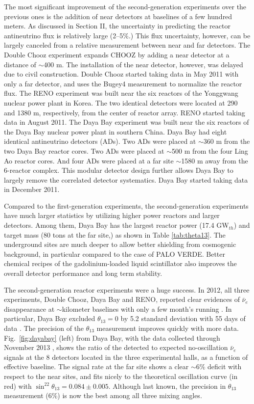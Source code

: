 The most significant improvement of the second-generation experiments over the previous ones is the addition of near detectors at baselines of a few hundred meters. 
As discussed in Section II, the uncertainty in predicting the reactor antineutrino flux is relatively large (2--5\%.) 
This flux uncertainty, however, can be largely canceled from a relative measurement between near and far detectors. 
The Double Chooz experiment expands CHOOZ by adding a near detector at a distance of $\sim$400 m. 
The installation of the near detector, however, was delayed due to civil construction. 
Double Chooz started taking data in May 2011 with only a far detector, and uses the Bugey4 \cite{Bugey4} measurement to normalize the reactor flux. 
The RENO experiment was built near the six reactors of the Yonggwang nuclear power plant in Korea. 
The two identical detectors were located at 290 and 1380 m, respectively, from the center of reactor array. 
RENO started taking data in August 2011. 
The Daya Bay experiment was built near the six reactors of the Daya Bay nuclear power plant in southern China. 
Daya Bay had eight identical antineutrino detectors (ADs). 
Two ADs were placed at $\sim$360 m from the two  Daya Bay reactor cores. 
Two ADs were placed at $\sim$500 m from the four Ling Ao reactor cores. 
And four ADs were placed at a far site $\sim$1580 m away from the 6-reactor complex. 
This modular detector design further allows Daya Bay to largely remove the correlated detector systematics. 
Daya Bay started taking data in December 2011.

Compared to the first-generation experiments, the second-generation experiments have much larger statistics by utilizing higher power reactors and larger detectors. Among them, Daya Bay has the largest reactor power (17.4 GW$_{th}$) and target mass (80 tons at the far site,) as shown in Table \ref{tab:theta13}. 
The underground sites are much deeper to allow better shielding from cosmogenic background, in particular compared to the case of PALO VERDE. 
Better chemical recipes of the gadolinium-loaded liquid scintillator also improves the overall detector performance and long term stability.

The second-generation reactor experiments were a huge success. 
In 2012, all three experiments, Double Chooz, Daya Bay and RENO, reported clear evidences of $\bar\nu_{e}$ disappearance at $\sim$kilometer baselines with only a few month's running \cite{DChooz,Reno,Dayabay}. 
In particular, Daya Bay excluded $\theta_{13}=0$ by 5.2 standard deviation with 55 days of data \cite{Dayabay}. 
The precision of the $\theta_{13}$ measurement improves quickly with more data.
Fig.~\ref{fig:dayabay} (left) from Daya Bay, with the data collected through November 2013 \cite{Zhang-Neutrino14}, shows the ratio of the detected to expected no-oscillation $\bar\nu_{e}$ signals at the 8 detectors located in the three experimental halls, as a function of effective baseline.
The signal rate at the far site shows a clear $\sim$6\% deficit with respect to the near sites, and fits nicely to the theoretical oscillation curve (in red) with $\sin^22\theta_{13} = 0.084 \pm 0.005$. 
Although last known, the precision in $\theta_{13}$ measurement (6\%) is now the best among all three mixing angles.

